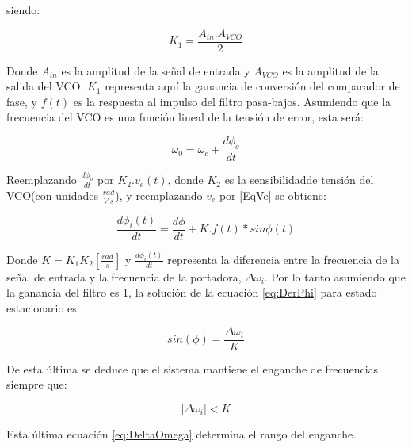 siendo: 

\begin{equation}
	K_1 = \frac{A_{in}.A_{VCO}}{2}
\end{equation}

Donde $A_{in}$ es la amplitud de la señal de entrada y $A_{VCO}$ es la amplitud de la salida del VCO. $K_1$ representa aquí la ganancia de conversión del comparador de fase, y $f(t)$ es la respuesta al impulso del filtro pasa-bajos. Asumiendo que la frecuencia del VCO es una función lineal de la tensión de error, esta será:

\begin{equation}
	\omega_0 = \omega_c + \frac{d\phi_o}{dt}
\end{equation}

Reemplazando $\frac{d\phi_o}{dt}$ por $K_2.v_e(t)$, donde $K_2$ es la sensibilidadde tensión del VCO(con unidades $\frac{rad}{V.s}$), y reemplazando $v_e$ por \ref{EqVe} se obtiene:

\begin{equation}
	\frac{d\phi_i(t)}{dt} = \frac{d\phi}{dt} +K.f(t)*sin\phi(t)
	\label{eq:DerPhi}
\end{equation}

Donde $K = K_1 K_2 [\frac{rad}{s}]$ y $\frac{d\phi_i(t)}{dt}$ representa la diferencia entre la frecuencia de la señal de entrada y la frecuencia de la portadora, $\Delta\omega_i$. Por lo tanto asumiendo que la ganancia del filtro es 1, la solución de la ecuación \ref{eq:DerPhi} para estado estacionario es:

\begin{equation}
	sin(\phi) = \frac{\Delta\omega_i}{K}
	\label{eq:SinPhi}
\end{equation}

De esta última se deduce que el sistema mantiene el enganche de frecuencias siempre que:

\begin{equation}
	|\Delta\omega_i|< K
	\label{eq:DeltaOmega}
\end{equation}

Esta última ecuación \ref{eq:DeltaOmega} determina el rango del enganche.

